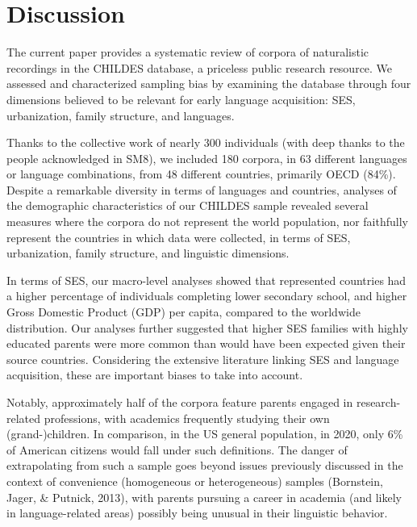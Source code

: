 \documentclass[
  man,floatsintext]{apa6}
\begin{document}
\section{Discussion}\label{discussion}

The current paper provides a systematic review of corpora of naturalistic recordings in the CHILDES database, a priceless public research resource. We assessed and characterized sampling bias by examining the database through four dimensions believed to be relevant for early language acquisition: SES, urbanization, family structure, and languages.

Thanks to the collective work of nearly 300 individuals (with deep thanks to the people acknowledged in SM8), we included 180 corpora, in 63 different languages or language combinations, from 48 different countries, primarily OECD (84\%). Despite a remarkable diversity in terms of languages and countries, analyses of the demographic characteristics of our CHILDES sample revealed several measures where the corpora do not represent the world population, nor faithfully represent the countries in which data were collected, in terms of SES, urbanization, family structure, and linguistic dimensions.

In terms of SES, our macro-level analyses showed that represented countries had a higher percentage of individuals completing lower secondary school, and higher Gross Domestic Product (GDP) per capita, compared to the worldwide distribution. Our analyses further suggested that higher SES families with highly educated parents were more common than would have been expected given their source countries. Considering the extensive literature linking SES and language acquisition, these are important biases to take into account.

Notably, approximately half of the corpora feature parents engaged in research-related professions, with academics frequently studying their own (grand-)children. In comparison, in the US general population, in 2020, only 6\% of American citizens would fall under such definitions. The danger of extrapolating from such a sample goes beyond issues previously discussed in the context of convenience (homogeneous or heterogeneous) samples (Bornstein, Jager, \& Putnick, 2013), with parents pursuing a career in academia (and likely in language-related areas) possibly being unusual in their linguistic behavior.
\end{document}
